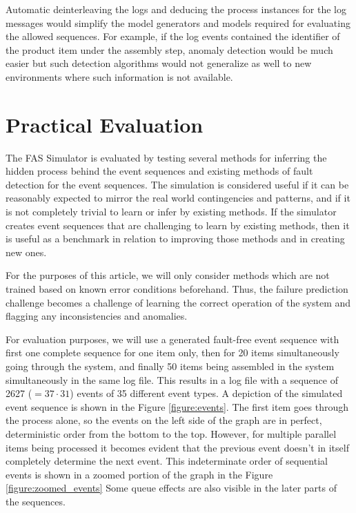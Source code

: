 \documentclass[journal]{IEEEtran}
\begin{document}
Automatic deinterleaving the logs and deducing the process instances for the log messages would simplify the model generators and models required
for evaluating the allowed sequences.
For example, if the log events contained the identifier of the product
item under the assembly step, anomaly detection would be much easier but such detection algorithms would not generalize as well
to new environments where such information is not available.

\section{Practical Evaluation}

The FAS Simulator is evaluated by testing several methods for inferring the hidden process behind the event sequences and existing methods of fault detection for
the event sequences.
The simulation is considered useful if it can be reasonably expected to mirror the real world contingencies and patterns, and if it is not completely trivial to
learn or infer by existing methods. If the simulator creates event sequences that are challenging to learn by existing methods, then it is useful as a benchmark
in relation to improving those methods and in creating new ones.

For the purposes of this article, we will only consider methods which are not trained based on known error conditions beforehand. Thus, the failure prediction challenge
becomes a challenge of learning the correct operation of the system and flagging any inconsistencies and anomalies.

For evaluation purposes, we will use a generated fault-free event sequence with first one complete sequence for one item only, then for 20 items simultaneously going through the system,
and finally 50 items being assembled in the system simultaneously in the same log file. This results in a log file with a sequence of 2627 ($ = 37 \cdot 31 $) events of 35 different
event types. A depiction of the simulated event sequence is shown in the Figure \ref{figure:events}. The first item goes through the process alone, so the events on the left side
of the graph are in perfect, deterministic order from the bottom to the top. However, for multiple parallel items being processed it becomes evident that the previous event doesn't in itself
completely determine the next event. This indeterminate order of sequential events is shown in a zoomed portion of the graph in the Figure \ref{figure:zoomed_events}
Some queue effects are also visible in the later parts of the sequences.
\end{document}
